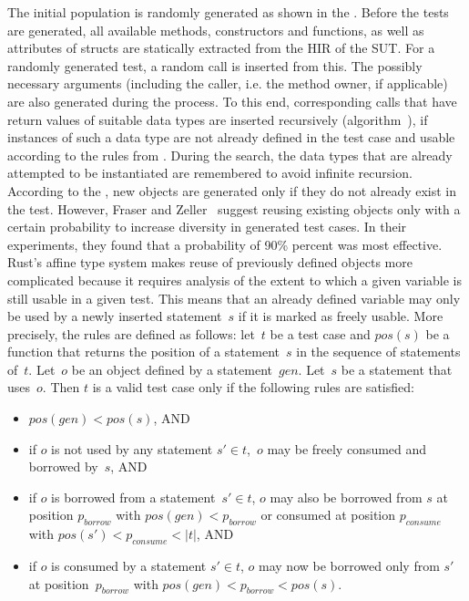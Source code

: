 \documentclass[paper=a4,%
  twoside,%
  BCOR4mm,%
  abstract=true,%
  toc=bibliography,%
  chapterprefix=true,%
  toc=bibliographynumbered,%
  open=right,%
  english,%
  pagesize=pdftex]{scrreprt}
\newcommand{\hir}{\ac{HIR}\xspace}
\begin{document}
The initial population is randomly generated as shown in the . Before the tests are generated, all available methods, constructors and functions, as well as attributes of structs are statically extracted from the \hir of the \ac{SUT}. For a randomly generated test, a random call is inserted from this. The possibly necessary arguments (including the caller, i.e. the method owner, if applicable) are also generated during the process. To this end, corresponding calls that have return values of suitable data types are inserted recursively (algorithm~), if instances of such a data type are not already defined in the test case and usable according to the rules from . During the search, the data types that are already attempted to be instantiated are remembered to avoid infinite recursion. According to the , new objects are generated only if they do not already exist in the test. However, Fraser and Zeller~\cite{Fraser2012} suggest reusing existing objects only with a certain probability to increase diversity in generated test cases. In their experiments, they found that a probability of 90\% percent was most effective. Rust's affine type system makes reuse of previously defined objects more complicated because it requires analysis of the extent to which a given variable is still usable in a given test. This means that an already defined variable may only be used by a newly inserted statement~$s$ if it is marked as freely usable. More precisely, the rules are defined as follows: let~$t$ be a test case and $pos(s)$ be a function that returns the position of a statement~$s$ in the sequence of statements of~$t$. Let~$o$ be an object defined by a statement~$gen$. Let~$s$ be a statement that uses~$o$. Then $t$ is a valid test case only if the following rules are satisfied:

\begin{itemize}
    \item $pos(gen) < pos(s)$, AND
    \item if $o$ is not used by any statement $s' \in t$,~$o$ may be freely consumed and borrowed by~$s$, AND
    \item if $o$ is borrowed from a statement~$s' \in t$, $o$ may also be borrowed from $s$ at position $p_{borrow}$ with $pos(gen) < p_{borrow}$ or consumed at position $p_{consume}$ with $pos(s') < p_{consume} < \left|t\right|$, AND
    \item if $o$ is consumed by a statement $s' \in t$, $o$ may now be borrowed only from $s'$ at position~$p_{borrow}$ with $pos(gen) < p_{borrow} < pos(s)$.
\end{itemize}
\end{document}
